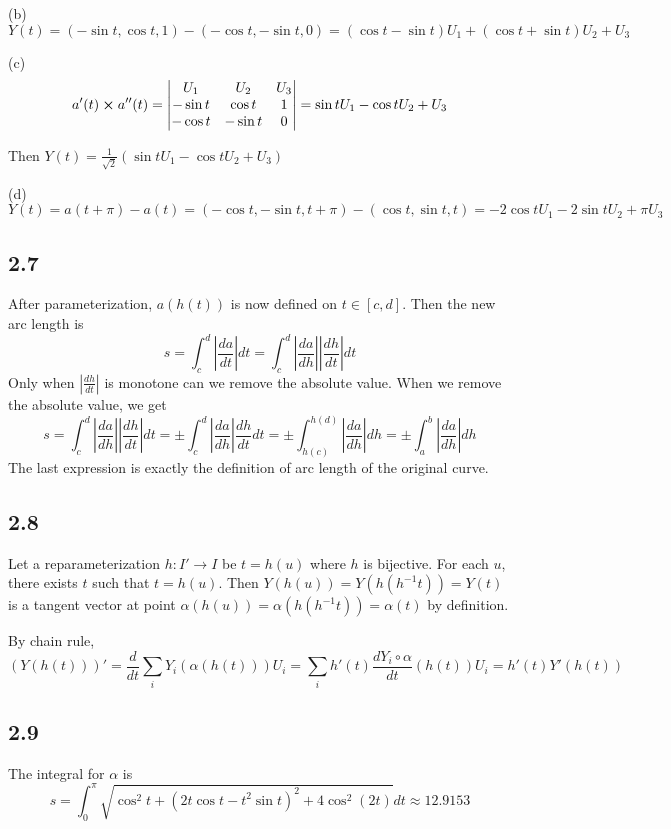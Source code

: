 \documentclass[12pt]{article}
\begin{document}
(b) $Y(t) = (-\sin t, \cos t, 1) - (-\cos t, -\sin t, 0) = (\cos t - \sin t)U_1 + (\cos t + \sin t)U_2 + U_3$

(c) $$a'(t) \cross a''(t) = \begin{vmatrix}
	U_1 & U_2 & U_3 \\
	-\sin t & \cos t & 1 \\
	-\cos t & -\sin t & 0 \\
\end{vmatrix} = \sin t U_1 - \cos t U_2 + U_3$$

Then $Y(t) = \frac{1}{\sqrt{2}}(\sin t U_1 - \cos t U_2 + U_3)$

(d) $Y(t) = a(t+\pi) - a(t) = (-\cos t, -\sin t, t+\pi) - (\cos t, \sin t, t) = -2\cos t U_1 - 2 \sin t U_2 + \pi U_3 $

\subsection*{2.7}
After parameterization, $a(h(t))$ is now defined on $t\in [c, d]$. Then the new arc length is $$ s = \int_c^d \left|\frac{da}{dt}\right|dt = \int_c^d \left|\frac{da}{dh}\right| \left|\frac{dh}{dt}\right|dt $$ 
Only when $\left|\frac{dh}{dt}\right|$ is monotone can we remove the absolute value. When we remove the absolute value, we get
$$ s = \int_c^d \left|\frac{da}{dh}\right| \left|\frac{dh}{dt}\right|dt = \pm \int_c^d \left|\frac{da}{dh}\right| \frac{dh}{dt} dt =  \pm \int_{h(c)}^{h(d)} \left|\frac{da}{dh}\right| dh  = \pm \int_{a}^{b} \left|\frac{da}{dh}\right| dh  $$ 
The last expression is exactly the definition of arc length of the original curve. \QED

\subsection*{2.8}
Let a reparameterization $h: I' \rightarrow I$ be $t = h(u)$ where $h$ is bijective. For each $u$, there exists $t$ such that $t = h(u)$. Then $Y(h(u)) = Y(h(h^{-1}t)) = Y(t)$ is a tangent vector at point $\alpha (h(u)) = \alpha (h(h^{-1}t)) = \alpha(t)$ by definition. \QED

By chain rule, $$(Y(h(t)))' =  \frac{d}{dt}\sum_i Y_i(\alpha(h(t)))U_i = \sum_i h'(t) \frac{dY_i \circ \alpha}{dt} (h(t))U_i =  h'(t)Y'(h(t))$$

\subsection*{2.9}
The integral for $\alpha$ is $$s = \int^\pi_0 \sqrt{\cos^2 t + (2t\cos t - t^2 \sin t)^2 + 4 \cos^2(2t)} dt \approx 12.9153$$
\end{document}

